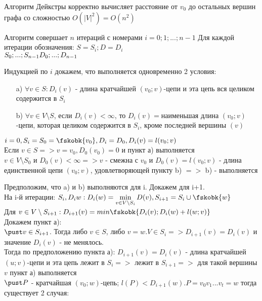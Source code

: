\begin{proofs}
	Алгоритм Дейкстры корректно вычисляет расстояние от $v_0$ до остальных вершин графа со сложностью $O(|V|^2) = O(n^2)$
	\begin{dokvo}
		\begin{enumerate*}
			\item Алгоритм совершает $n$ итераций с номерами $i = 0; 1; ...; n-1$ Для каждой итерации обозначения: $S = S_i; D = D_i$\\
			$S_0; ...; S_{n-1}\\
			D_0; ...; D_{n-1}$
			\item Индукцией по $i$ докажем, что выполняется одновременно 2 условия:
			\begin{itemize}
				\item[a)] $\forall v \in S: D_i(v)$ - длина кратчайшей $(v_0; v)$-цепи и эта цепь вся целиком содержится в $S_i$
				\item[b)] $\forall v \in V\setminus S$, если $D_i(v) < \infty$, то $D_i(v) = $наименьшая длина $(v_0; v)$-цепи, которая целиком содержится в $S_i$, кроме последней вершины $(v)$
			\end{itemize}
			\item $i=0, S_i=S_0=\fskobk{v_0}, D_i=D_0, D_i(v)=l(v_0; v)$\\
			Если $v \in S => v = v_0, D_0(v_0) = 0$ и пункт а) выполняется\\
			$v \in V\setminus S_0$ и $D_0(v) < \infty => v$ - смежна с $v_0$ и $D_0(v)=l(v_0;v)$ - длина единственной цепи $(v_0;v)$, удовлетворяющей пункту b) $=>$ b) - выполняется
			\item Предположим, что a) и b) выполняются для i. Докажем для i+1.\\
			На i-й итерации: $S_i, D_i\\
			w: D_i(w) = \min\limits_{v \in V\setminus S_i}D(v), S_{i+1} = S_i \cup \fskobk{w}$\\
			Для $v \in V\setminus S_{i+1}: D_{i+1}(v) = min\fskobk{D_i(v); D_i(w) + l(w; v)} $\\
			Докажем пункт а):\\
			$\pust v \in S_{i+1}$. Тогда либо $v \in S$, либо $v=w. V\in S_i => D_{i+1}(v) = D_i(v)$ и значение $D_i(v)$ - не менялось.\\
			Тогда по предположению пункта а): $D_{i+1}(v) = D_i(v)$ - длина кратчайшей $(u;v)$-цепи и эта цепь лежит в $S_i =>$ лежит в $S_{i+1} =>$ для такой вершины $v$ пункт а) выполняется\\
			$\pust P$ - кратчайшая $(v_0;w)$-цепь; $l(P) < D_{i+1}(w). P = v_0v_1...v_t=w$ тогда существует 2 случая:

\end{enumerate*}
\end{dokvo}
\end{proofs}
